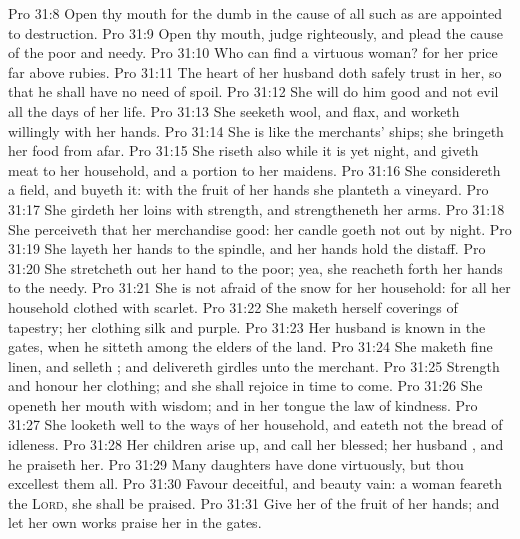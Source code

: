 \vs Pro 31:8 Open thy mouth for the dumb in the cause of all such as are appointed to destruction.
\vs Pro 31:9 Open thy mouth, judge righteously, and plead the cause of the poor and needy.
\vs Pro 31:10 Who can find a virtuous woman? for her price  far above rubies.
\vs Pro 31:11 The heart of her husband doth safely trust in her, so that he shall have no need of spoil.
\vs Pro 31:12 She will do him good and not evil all the days of her life.
\vs Pro 31:13 She seeketh wool, and flax, and worketh willingly with her hands.
\vs Pro 31:14 She is like the merchants' ships; she bringeth her food from afar.
\vs Pro 31:15 She riseth also while it is yet night, and giveth meat to her household, and a portion to her maidens.
\vs Pro 31:16 She considereth a field, and buyeth it: with the fruit of her hands she planteth a vineyard.
\vs Pro 31:17 She girdeth her loins with strength, and strengtheneth her arms.
\vs Pro 31:18 She perceiveth that her merchandise  good: her candle goeth not out by night.
\vs Pro 31:19 She layeth her hands to the spindle, and her hands hold the distaff.
\vs Pro 31:20 She stretcheth out her hand to the poor; yea, she reacheth forth her hands to the needy.
\vs Pro 31:21 She is not afraid of the snow for her household: for all her household  clothed with scarlet.
\vs Pro 31:22 She maketh herself coverings of tapestry; her clothing  silk and purple.
\vs Pro 31:23 Her husband is known in the gates, when he sitteth among the elders of the land.
\vs Pro 31:24 She maketh fine linen, and selleth ; and delivereth girdles unto the merchant.
\vs Pro 31:25 Strength and honour  her clothing; and she shall rejoice in time to come.
\vs Pro 31:26 She openeth her mouth with wisdom; and in her tongue  the law of kindness.
\vs Pro 31:27 She looketh well to the ways of her household, and eateth not the bread of idleness.
\vs Pro 31:28 Her children arise up, and call her blessed; her husband , and he praiseth her.
\vs Pro 31:29 Many daughters have done virtuously, but thou excellest them all.
\vs Pro 31:30 Favour  deceitful, and beauty  vain:  a woman  feareth the \textsc{Lord}, she shall be praised.
\vs Pro 31:31 Give her of the fruit of her hands; and let her own works praise her in the gates.
